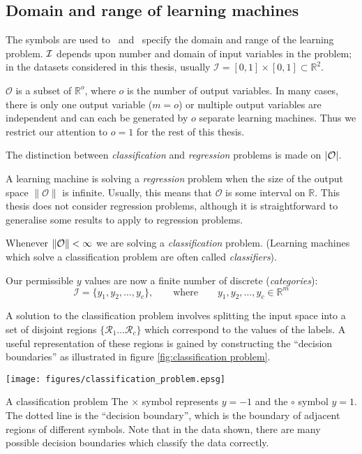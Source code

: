 \subsection{Domain and range of learning machines}
\label{sec:domain and range}

The symbols are used to \calI\ and \calO\ specify the domain and
range of the learning problem.  $\mathcal{I}$ depends upon number and
domain of input variables in the problem; in the datasets considered in
this thesis, usually $\mathcal{I} = [0,1] \times [0,1] \subset
\mathbb{R}^2$.

$\mathcal{O}$ is a subset of $\mathbb{R}^o$, where $o$ is the number
of output variables.  In many cases, there is only one output
variable ($m=o$) or multiple output variables are independent and
can each be generated by $o$ separate learning machines.
Thus we restrict our attention to $o=1$ for the rest of this thesis.

The distinction between \emph{classification} and \emph{regression}
problems is made on $|\mathcal{O}|$.

A learning machine is solving a \emph{regression} problem when the size of
the output space $\|\mathcal{O}\|$ is infinite.  Usually, this means
that $\mathcal{O}$ is some interval on $\mathbb{R}$.  This thesis does
not consider regression problems, although it is straightforward
to generalise some results to apply to regression problems.

Whenever $\|\mathcal{O}\| < \infty$ we are solving a \emph{classification}
problem.  (Learning machines which solve a classification problem are
often called \emph{classifiers}).

Our permissible $y$ values are now a finite number of discrete
(\emph{categories}):
%
\begin{equation}
\mathcal{I} = \{y_1, y_2, \ldots, y_c\}, \qquad \mbox{where} \qquad y_1, y_2,
\ldots, y_c \in \mathbb{R}^m
\end{equation}

A solution to the classification problem involves splitting the input space
into a set of disjoint regions $\{ \mathcal{R}_1 \ldots \mathcal{R}_c
\}$ which correspond to the values of the labels.  A useful representation
of these regions is gained by constructing the ``decision boundaries''
as illustrated in figure \ref{fig:classification problem}.

\begin{linefigure}
\begin{center}
\texttt{[image: figures/classification\_problem.epsg]}
\end{center}
\begin{capt}{A classification problem}
The $\times$ symbol represents $y=-1$ and the $\circ$ symbol $y=1$.
The dotted line is the ``decision boundary'', which is the boundary of
adjacent regions of different symbols.  Note that in the data shown,
there are many possible decision boundaries which classify the data
correctly.
\end{capt}
\label{fig:classification problem}
\end{linefigure}

